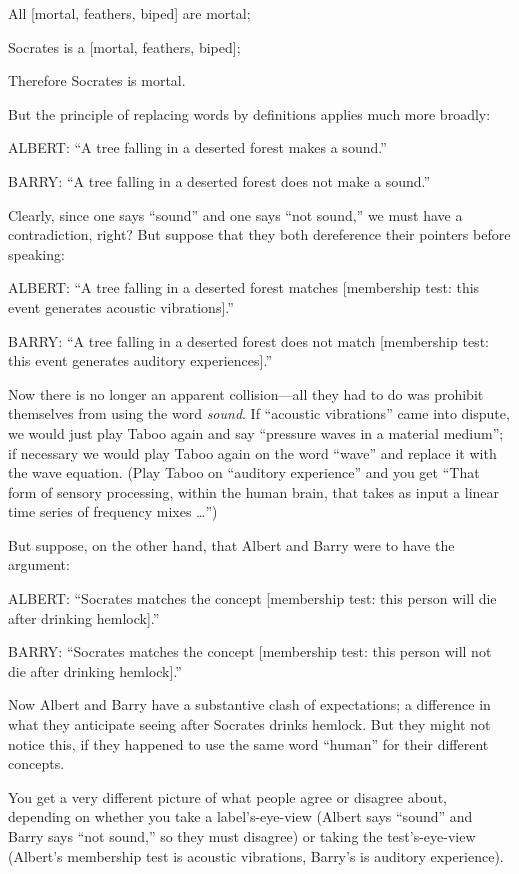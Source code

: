 {
 All [mortal, {\textlnot}feathers, biped] are mortal;}

{
 Socrates is a [mortal, {\textlnot}feathers, biped];}

{
 Therefore Socrates is mortal.}

{
 But the principle of replacing words by definitions applies much
more broadly:}

{
 ALBERT: ``A tree falling in a deserted forest
makes a sound.''}

{
 BARRY: ``A tree falling in a deserted forest does
not make a sound.''}

{
 Clearly, since one says
``sound'' and one says
``not sound,'' we must have a
contradiction, right? But suppose that they both dereference their
pointers before speaking:}

{
 ALBERT: ``A tree falling in a deserted forest
matches [membership test: this event generates acoustic
vibrations].''}

{
 BARRY: ``A tree falling in a deserted forest does
not match [membership test: this event generates auditory
experiences].''}

{
 Now there is no longer an apparent collision---all they had to do
was prohibit themselves from using the word \textit{sound}. If
``acoustic vibrations'' came into
dispute, we would just play Taboo again and say
``pressure waves in a material
medium''; if necessary we would play Taboo again on
the word ``wave'' and replace it
with the wave equation. (Play Taboo on ``auditory
experience'' and you get ``That form
of sensory processing, within the human brain, that takes as input a
linear time series of frequency mixes \ldots'')}

{
 But suppose, on the other hand, that Albert and Barry were to have
the argument:}

{
 ALBERT: ``Socrates matches the concept
[membership test: this person will die after drinking
hemlock].''}

{
 BARRY: ``Socrates matches the concept [membership
test: this person will not die after drinking
hemlock].''}

{
 Now Albert and Barry have a substantive clash of expectations; a
difference in what they anticipate seeing after Socrates drinks
hemlock. But they might not notice this, if they happened to use the
same word ``human'' for their
different concepts.}

{
 You get a very different picture of what people agree or disagree
about, depending on whether you take a label's-eye-view
(Albert says ``sound'' and Barry
says ``not sound,'' so they must
disagree) or taking the test's-eye-view
(Albert's membership test is acoustic vibrations,
Barry's is auditory experience).}

